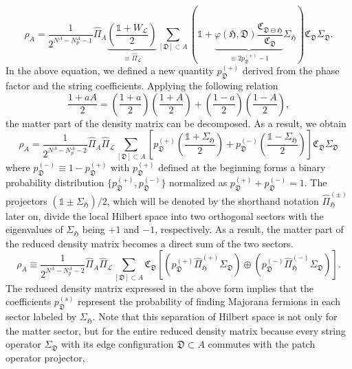 \documentclass[12font]{article}
\theoremstyle{definition}
\newcommand{\lr}[1]{\left(  #1  \right)}
\newcommand{\lrm}[1]{\left[  #1  \right]}
\begin{document}
\[
    \rho_A
    =
    \frac{1}{2^{N^A - N^A_p - 1}}
    \hat{\Pi}_A
    \underbrace{
        \lr{
        \frac{\mathds{1} + W_\mathcal{L}}{2}
        }
    }_{\equiv \hat{\Pi}_\mathcal{L} }
    \sum_{[\mathfrak{D}]\subset A}
    \lr{
        \mathds{1} 
        + 
        \underbrace{
            \varphi(\mathfrak{H},\mathfrak{D}) \frac{\mathfrak{C}_{\mathfrak{D}\ominus\mathfrak{H}}}{\mathfrak{C}_\mathfrak{D}}
        }_{\equiv 2p_\mathfrak{D}^{(+)}-1 }
        \Sigma_\mathfrak{H}
    }
    \mathfrak{C}_\mathfrak{D}
    \Sigma_\mathfrak{D} .
\]
In the above equation, we defined a new quantity $p_\mathfrak{D}^{(+)}$ derived from the phase factor and the string coefficients. Applying the following relation
\[
\frac{1 + aA}{2} = \lr{\frac{1+a}{2}}\lr{\frac{1+A}{2}} + \lr{\frac{1-a}{2}}\lr{\frac{1-A}{2}},
\]
the matter part of the density matrix can be decomposed. As a result, we obtain
\[
    \rho_A
    =
    \frac{1}{2^{N^A - N^A_p - 2}}
    \hat{\Pi}_A
    \hat{\Pi}_\mathcal{L}
    \sum_{[\mathfrak{D}]\subset A}
    \lrm{
        p_\mathfrak{D}^{(+)}
        \lr{
        \frac{\mathds{1} + \Sigma_\mathfrak{H}}{2}
        }
        +
        p_\mathfrak{D}^{(-)}
        \lr{
        \frac{\mathds{1} - \Sigma_\mathfrak{H}}{2}
        }
    }
    \mathfrak{C}_\mathfrak{D}
    \Sigma_\mathfrak{D} 
\]
where $p_{\mathfrak{D}}^{(-)}\equiv 1 - p_\mathfrak{D}^{(+)}$ with $p_\mathfrak{D}^{(+)}$ defined at the beginning forms a binary probability distribution $\{p_{\mathfrak{D}}^{(+)},p_{\mathfrak{D}}^{(-)}\}$ normalized as $p_\mathfrak{D}^{(+)} + p_{\mathfrak{D}}^{(-)} = 1$. The projectors $\lr{\mathds{1} \pm \Sigma_\mathfrak{H}}/2$, which will be denoted by the shorthand notation $\hat{\Pi}^{(\pm)}_\mathfrak{H}$ later on, divide the local Hilbert space into two orthogonal sectors with the eigenvalues of $\Sigma_\mathfrak{H}$ being $+1$ and $-1$, respectively. As a result, the matter part of the reduced density matrix becomes a direct sum of the two sectors.
\[
    \rho_A
    \equiv
    \frac{1}{2^{N^A - N^A_p - 2}}
    \hat{\Pi}_A
    \hat{\Pi}_\mathcal{L}
    \sum_{[\mathfrak{D}]\subset A}
    \mathfrak{C}_\mathfrak{D}
    \lrm{
        \lr{
        p_\mathfrak{D}^{(+)} 
        \hat{\Pi}_\mathfrak{H}^{(+)}
        \Sigma_\mathfrak{D}
        }
        \oplus
        \lr{
        p_\mathfrak{D}^{(-)} 
        \hat{\Pi}_\mathfrak{H}^{(-)}
        \Sigma_\mathfrak{D}
        }
    }.
\]
The reduced density matrix expressed in the above form implies that the coefficients $p_\mathfrak{D}^{(s)}$ represent the probability of finding Majorana fermions in each sector labeled by $\Sigma_\mathfrak{H}$. Note that this separation of Hilbert space is not only for the matter sector, but for the entire reduced density matrix because every string operator $\Sigma_\mathfrak{D}$ with its edge configuration $\mathfrak{D}\subset A$ commutes with the patch operator projector,
\end{document}

